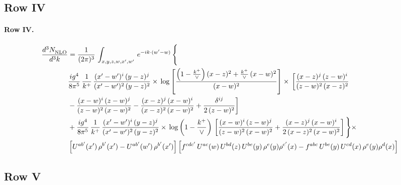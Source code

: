 \documentclass[10pt]{article}
\numberwithin{equation}{section}
\begin{document}
\subsection{Row IV}
\paragraph{Row IV.}
\begin{align}
    \frac{d^{3}N_{\rm NLO}^{\rm}}{d^{3}k}  & =   \frac{1}{(2\pi)^{3}}\,
    \int_{x,y,z,w,x',w'}\,e^{-ik\cdot (w^\prime-w)}\,\Bigg\{\notag \\
& \frac{ig^{4}}{8\pi^{5}}\,\frac{1}{k^{+}}\,\frac{(x'-w')^{i}\,(y-z)^{j}}{(x'-w')^{2}\,(y-z)^{2}}\times\,\log{\left[\frac{\left(1-\frac{k^{+}}{\vee}\right)(x-z)^{2}+\frac{k^{+}}{\vee}\,(x-w)^{2}}{(x-w)^{2}}\right]}\times\, \bigg[\frac{(x-z)^{j}\,(z-w)^{i}}{(z-w)^{2}\,(x-z)^{2}}\notag \\ & -\frac{(x-w)^{i}\,(z-w)^{j}}{(z-w)^{2}\,(x-w)^{2}}-\frac{(x-z)^{j}\,(x-w)^{i}}{(x-z)^{2}\,(x-w)^{2}}+\frac{\delta^{ij}}{2\,(z-w)^{2}}\bigg] \notag \\
& + \frac{ig^{4}}{8\pi^{5}}\,\frac{1}{k^{+}}\,\frac{(x'-w')^{i}\,(y-z)^{j}}{(x'-w')^{2}\,(y-z)^{2}}\times\,\log{\left(1-\frac{k^{+}}{\vee}\right)}\,\left[\frac{(x-w)^{i}\,(z-w)^{j}}{(z-w)^{2}\,(x-w)^{2}}+\frac{(x-z)^{j}\,(x-w)^{i}}{2\, (x-z)^{2}\,(x-w)^{2}}\right]\Bigg\}\times\notag \\ &  \left[U^{ab'}(x')\,\rho^{b'}(x')-U^{ab'}(w')\,\rho^{b'}(x')\right] \left[f^{cdc'}\,U^{ac}(w)\,U^{bd}(z)\,U^{be}(y)\,\rho^{e}(y)\rho^{c'}(x)-f^{abc}\,U^{be}(y)\,U^{cd}(x)\,\rho^{e}(y)\rho^{d}(x)\right] \label{eq:F:G1IV}
\end{align}

\subsection{Row V}
\end{document}

